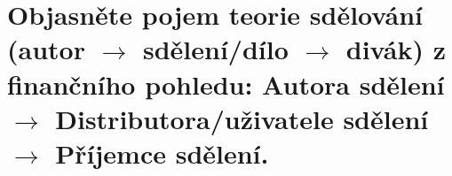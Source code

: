 \section{Objasněte pojem teorie sdělování (autor $\rightarrow$ sdělení/dílo $\rightarrow$ divák) z finančního pohledu: 
Autora sdělení $\rightarrow$ Distributora/uživatele sdělení $\rightarrow$ Příjemce sdělení.}